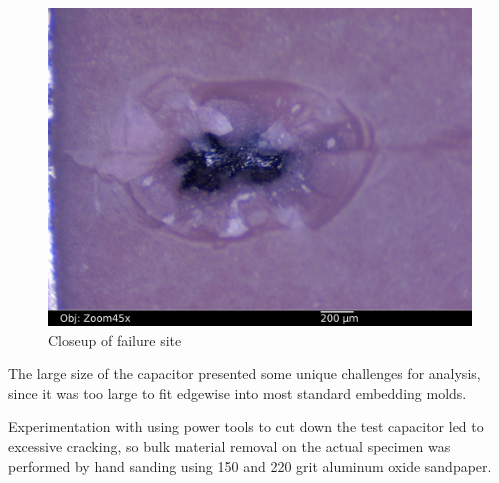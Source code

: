 \documentclass{article}
\begin{document}
\begin{figure}[h]
\includegraphics[scale=0.25]{03-badcap-side_annotated.jpg}
\caption{Closeup of failure site}
\label{fail-closeup}
\end{figure}

The large size of the capacitor presented some unique challenges for analysis, since it was too large to fit edgewise
into most standard embedding molds.

Experimentation with using power tools to cut down the test capacitor led to excessive cracking, so bulk material
removal on the actual specimen was performed by hand sanding using 150 and 220 grit aluminum oxide sandpaper.
\end{document}
